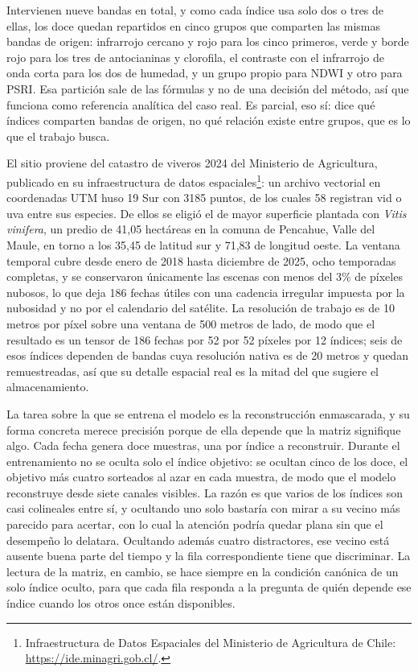Intervienen nueve bandas en total, y como cada índice usa solo dos o tres de ellas, los doce quedan repartidos en cinco grupos que comparten las mismas bandas de origen: infrarrojo cercano y rojo para los cinco primeros, verde y borde rojo para los tres de antocianinas y clorofila, el contraste con el infrarrojo de onda corta para los dos de humedad, y un grupo propio para NDWI y otro para PSRI. Esa partición sale de las fórmulas y no de una decisión del método, así que funciona como referencia analítica del caso real. Es parcial, eso sí: dice qué índices comparten bandas de origen, no qué relación existe entre grupos, que es lo que el trabajo busca.

El sitio proviene del catastro de viveros 2024 del Ministerio de Agricultura, publicado en su infraestructura de datos espaciales\footnote{Infraestructura de Datos Espaciales del Ministerio de Agricultura de Chile: \url{https://ide.minagri.gob.cl/}.}: un archivo vectorial en coordenadas UTM huso 19 Sur con 3185 puntos, de los cuales 58 registran vid o uva entre sus especies. De ellos se eligió el de mayor superficie plantada con \emph{Vitis vinifera}, un predio de 41,05 hectáreas en la comuna de Pencahue, Valle del Maule, en torno a los 35,45\textdegree{} de latitud sur y 71,83\textdegree{} de longitud oeste. La ventana temporal cubre desde enero de 2018 hasta diciembre de 2025, ocho temporadas completas, y se conservaron únicamente las escenas con menos del 3\% de píxeles nubosos, lo que deja 186 fechas útiles con una cadencia irregular impuesta por la nubosidad y no por el calendario del satélite. La resolución de trabajo es de 10 metros por píxel sobre una ventana de 500 metros de lado, de modo que el resultado es un tensor de 186 fechas por 52 por 52 píxeles por 12 índices; seis de esos índices dependen de bandas cuya resolución nativa es de 20 metros y quedan remuestreadas, así que su detalle espacial real es la mitad del que sugiere el almacenamiento.

La tarea sobre la que se entrena el modelo es la reconstrucción enmascarada, y su forma concreta merece precisión porque de ella depende que la matriz signifique algo. Cada fecha genera doce muestras, una por índice a reconstruir. Durante el entrenamiento no se oculta solo el índice objetivo: se ocultan cinco de los doce, el objetivo más cuatro sorteados al azar en cada muestra, de modo que el modelo reconstruye desde siete canales visibles. La razón es que varios de los índices son casi colineales entre sí, y ocultando uno solo bastaría con mirar a su vecino más parecido para acertar, con lo cual la atención podría quedar plana sin que el desempeño lo delatara. Ocultando además cuatro distractores, ese vecino está ausente buena parte del tiempo y la fila correspondiente tiene que discriminar. La lectura de la matriz, en cambio, se hace siempre en la condición canónica de un solo índice oculto, para que cada fila responda a la pregunta de quién depende ese índice cuando los otros once están disponibles.

